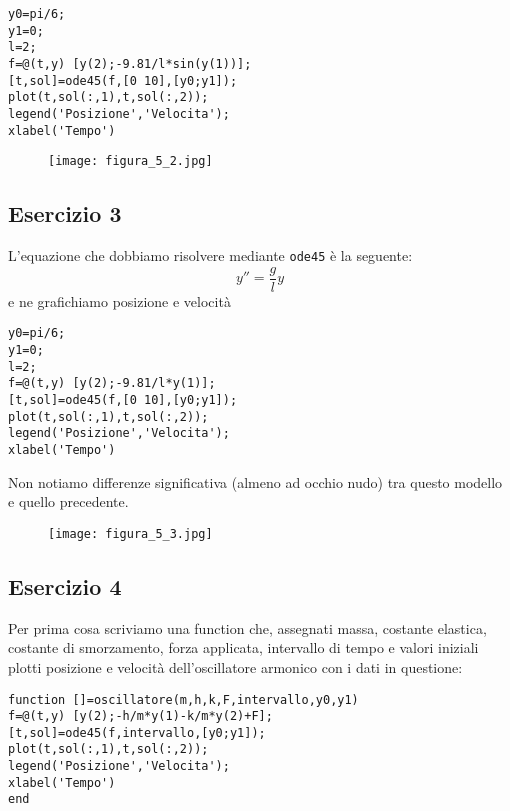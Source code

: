 \documentclass{article}
\begin{document}
\begin{lstlisting}
y0=pi/6;
y1=0;
l=2;
f=@(t,y) [y(2);-9.81/l*sin(y(1))];
[t,sol]=ode45(f,[0 10],[y0;y1]);
plot(t,sol(:,1),t,sol(:,2));
legend('Posizione','Velocita');
xlabel('Tempo')
\end{lstlisting}

\begin{figure}[!h]
\centering
\texttt{[image: figura\_5\_2.jpg]}
\end{figure}

\newpage

\subsection*{Esercizio 3}

L'equazione che dobbiamo risolvere mediante \texttt{ode45} è la seguente:
$$y''=\frac{g}{l}y$$
\noindent
e ne grafichiamo posizione e velocità

\begin{lstlisting}
y0=pi/6;
y1=0;
l=2;
f=@(t,y) [y(2);-9.81/l*y(1)];
[t,sol]=ode45(f,[0 10],[y0;y1]);
plot(t,sol(:,1),t,sol(:,2));
legend('Posizione','Velocita');
xlabel('Tempo')
\end{lstlisting}

\noindent
Non notiamo differenze significativa (almeno ad occhio nudo) tra questo modello e quello precedente.

\begin{figure}[!h]
\centering
\texttt{[image: figura\_5\_3.jpg]}
\end{figure}

\newpage

\subsection*{Esercizio 4}

Per prima cosa scriviamo una function che, assegnati massa, costante elastica, costante di smorzamento, forza applicata, intervallo di tempo e valori iniziali plotti posizione e velocità dell'oscillatore armonico con i dati in questione:

\begin{lstlisting}
function []=oscillatore(m,h,k,F,intervallo,y0,y1)
f=@(t,y) [y(2);-h/m*y(1)-k/m*y(2)+F];
[t,sol]=ode45(f,intervallo,[y0;y1]);
plot(t,sol(:,1),t,sol(:,2));
legend('Posizione','Velocita');
xlabel('Tempo')
end
\end{lstlisting}
\end{document}
